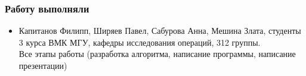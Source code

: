 \documentclass{beamer}
\begin{document}
	\begin{frame}
		\frametitle{Работу выполняли}
		\begin{itemize}
			\item Капитанов Филипп, Ширяев Павел, Сабурова Анна, Мешина Злата, студенты 3 курса ВМК МГУ, кафедры исследования операций, 312 группы. \\Все этапы работы (разработка алгоритма, написание программы, написание презентации)
		\end{itemize}	
	\end{frame}
\end{document}
